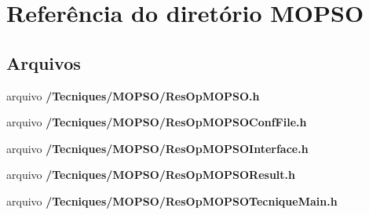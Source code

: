 \section{Referência do diretório M\+O\+P\+SO}
\label{dir_bd664e63f5623c1a2abbc5bc5d85cf8c}
\subsection*{Arquivos}
\begin{DoxyCompactItemize}
\item 
arquivo {\bf /\+Tecniques/\+M\+O\+P\+S\+O/\+Res\+Op\+M\+O\+P\+S\+O.\+h}
\item 
arquivo {\bf /\+Tecniques/\+M\+O\+P\+S\+O/\+Res\+Op\+M\+O\+P\+S\+O\+Conf\+File.\+h}
\item 
arquivo {\bf /\+Tecniques/\+M\+O\+P\+S\+O/\+Res\+Op\+M\+O\+P\+S\+O\+Interface.\+h}
\item 
arquivo {\bf /\+Tecniques/\+M\+O\+P\+S\+O/\+Res\+Op\+M\+O\+P\+S\+O\+Result.\+h}
\item 
arquivo {\bf /\+Tecniques/\+M\+O\+P\+S\+O/\+Res\+Op\+M\+O\+P\+S\+O\+Tecnique\+Main.\+h}
\end{DoxyCompactItemize}

